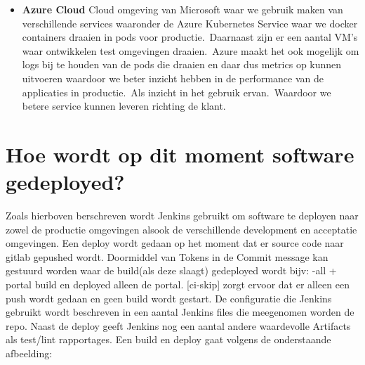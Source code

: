 \begin{itemize}
\item \textbf{Azure Cloud}
Cloud omgeving van Microsoft waar we gebruik maken van verschillende services waaronder de Azure Kubernetes Service waar we docker containers draaien in pods voor productie.\ Daarnaast zijn er een aantal VM's waar ontwikkelen test omgevingen draaien.\ Azure maakt het ook mogelijk om logs bij te houden van de pods die draaien en daar dus metrics op kunnen uitvoeren waardoor we beter inzicht hebben in de performance van de applicaties in productie.\ Als inzicht in het gebruik ervan.\ Waardoor we betere service kunnen leveren richting de klant.
\end{itemize}

\section{Hoe wordt op dit moment software gedeployed?}\label{sec:hoe-wordt-op-dit-moment-software-gedeployed?}
Zoals hierboven berschreven wordt Jenkins gebruikt om software te deployen naar zowel de productie omgevingen alsook de verschillende development en acceptatie omgevingen.
Een deploy wordt gedaan op het moment dat er source code naar gitlab gepushed wordt.
Doormiddel van Tokens in de Commit message kan gestuurd worden waar de build(als deze slaagt) gedeployed wordt bijv: {-all + portal} build en deployed alleen de portal. [ci-skip] zorgt ervoor dat er alleen een push wordt gedaan en geen build wordt gestart.
De configuratie die Jenkins gebruikt wordt beschreven in een aantal Jenkins files die meegenomen worden de repo.
Naast de deploy geeft Jenkins nog een aantal andere waardevolle Artifacts als test/lint rapportages.
Een build en deploy gaat volgens de onderstaande afbeelding:

